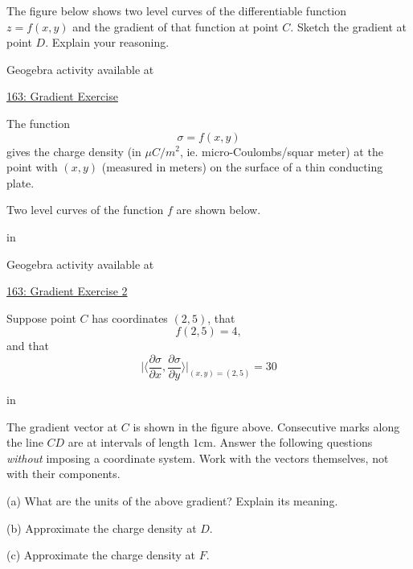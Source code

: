 \documentclass{ximera}
\newcommand{\pskip}{\vskip 0.1 in}
\begin{document}
\begin{question}  \label{Qd4r4356}
The figure below shows two level curves of the differentiable function $z=f(x,y)$ and the gradient of that function at point $C$. Sketch the gradient at point $D$. Explain your reasoning.

 
\begin{onlineOnly}
    \begin{center}
\end{center}
\end{onlineOnly}

Geogebra activity available at

\href{https://www.geogebra.org/classic/zau4grcm}{163: Gradient Exercise}
\end{question}


\begin{question} \label{Q34g4vbty}
The function 
\[
 \sigma = f(x,y)
\]
gives the charge density (in $\mu C/m^2$, ie. micro-Coulombs/squar meter) at the point with $(x,y)$ (measured in meters) on the surface of a thin conducting plate.

Two level curves of the function $f$ are shown below.

\pskip

 
\begin{onlineOnly}
    \begin{center}
\end{center}
\end{onlineOnly}

Geogebra activity available at

\href{https://www.geogebra.org/classic/xnqmhyvd}{163: Gradient Exercise 2}


Suppose point $C$ has coordinates $(2,5)$, that
\[
    f(2,5) = 4,
\]
and that
\[
    \Big|  \langle \frac{\partial \sigma}{\partial x}, \frac{\partial \sigma}{\partial y} \rangle \Big|_{(x,y) =(2,5)} = 30
\]

\pskip

The gradient vector at $C$ is shown in the figure above. Consecutive marks along the line $CD$ are at intervals of length $1$cm. Answer the following questions \emph{without} imposing a coordinate system. Work with the vectors themselves, not with their components.

(a) What are the units of the above gradient? Explain its meaning.

(b) Approximate the charge density at $D$.

(c) Approximate the charge density at $F$.



\end{question}
\end{document}
